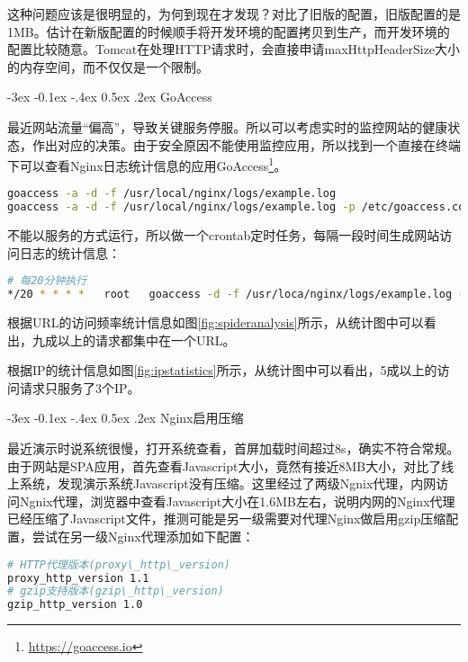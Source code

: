 \documentclass[8pt]{book}
\makeatletter
\numberwithin{dummy}{section}
\theoremstyle{ocrenumbox}
\theoremstyle{blacknumex}
\theoremstyle{blacknumbox}
\theoremstyle{ocrenum}
\renewcommand{\subsection}{\@startsection {subsection}{2}{\z@}
	{-3ex \@plus -0.1ex \@minus -.4ex}
	{0.5ex \@plus.2ex }
	{\normalfont\sffamily\bfseries}}
\makeatother
\begin{document}
这种问题应该是很明显的，为何到现在才发现？对比了旧版的配置，旧版配置的是1MB。估计在新版配置的时候顺手将开发环境的配置拷贝到生产，而开发环境的配置比较随意。Tomcat在处理HTTP请求时，会直接申请maxHttpHeaderSize大小的内存空间，而不仅仅是一个限制。


\subsection{GoAccess}

最近网站流量“偏高”，导致关键服务停服。所以可以考虑实时的监控网站的健康状态，作出对应的决策。由于安全原因不能使用监控应用，所以找到一个直接在终端下可以查看Nginx日志统计信息的应用GoAccess\footnote{\url{https://goaccess.io}}。

\begin{lstlisting}[language=Bash]
goaccess -a -d -f /usr/local/nginx/logs/example.log
goaccess -a -d -f /usr/local/nginx/logs/example.log -p /etc/goaccess.conf -o /data/html/hexo/public/go-access.html
\end{lstlisting}

不能以服务的方式运行，所以做一个crontab定时任务，每隔一段时间生成网站访问日志的统计信息：

\begin{lstlisting}[language=Bash]
# 每20分钟执行
*/20 * * * *   root   goaccess -d -f /usr/loca/nginx/logs/example.log -p /usr/local/etc/goaccess.conf
\end{lstlisting}

根据URL的访问频率统计信息如图\ref{fig:spideranalysis}所示，从统计图中可以看出，九成以上的请求都集中在一个URL。



根据IP的统计信息如图\ref{fig:ipstatistics}所示，从统计图中可以看出，5成以上的访问请求只服务了3个IP。



\subsection{Nginx启用压缩}

最近演示时说系统很慢，打开系统查看，首屏加载时间超过8s，确实不符合常规。由于网站是SPA应用，首先查看Javascript大小，竟然有接近8MB大小，对比了线上系统，发现演示系统Javascript没有压缩。这里经过了两级Ngnix代理，内网访问Ngnix代理，浏览器中查看Javascript大小在1.6MB左右，说明内网的Nginx代理已经压缩了Javascript文件，推测可能是另一级需要对代理Nginx做启用gzip压缩配置，尝试在另一级Nginx代理添加如下配置：

\begin{lstlisting}[language=Bash]
# HTTP代理版本(proxy\_http\_version)
proxy_http_version 1.1
# gzip支持版本(gzip\_http\_version)
gzip_http_version 1.0
\end{lstlisting}
\end{document}
